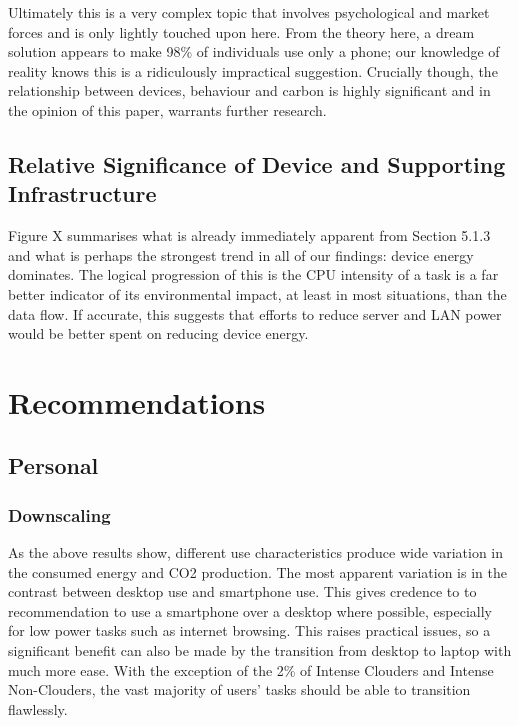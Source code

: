\documentclass[conference]{IEEEtran}
\begin{document}
Ultimately this is a very complex topic that involves psychological
and market forces and is only lightly touched upon here. From the
theory here, a dream solution appears to make 98\% of individuals use
only a phone; our knowledge of reality knows this is a ridiculously
impractical suggestion. Crucially though, the relationship between
devices, behaviour and carbon is highly significant and in the opinion
of this paper, warrants further research.

\subsection{Relative Significance of Device and Supporting
  Infrastructure}

Figure X summarises what is already immediately apparent from Section
5.1.3 and what is perhaps the strongest trend in all of our findings:
device energy dominates. The logical progression of this is the CPU
intensity of a task is a far better indicator of its environmental
impact, at least in most situations, than the data flow.  If accurate,
this suggests that efforts to reduce server and LAN power would be
better spent on reducing device energy.

\section{Recommendations}

\subsection{Personal}

\subsubsection{Downscaling}

As the above results show, different use characteristics produce wide
variation in the consumed energy and CO2 production. The most apparent
variation is in the contrast between desktop use and smartphone
use. This gives credence to to recommendation to use a smartphone over
a desktop where possible, especially for low power tasks such as
internet browsing. This raises practical issues, so a significant
benefit can also be made by the transition from desktop to laptop with
much more ease. With the exception of the 2\% of Intense Clouders and
Intense Non-Clouders, the vast majority of users’ tasks should be able
to transition flawlessly.
\end{document}
